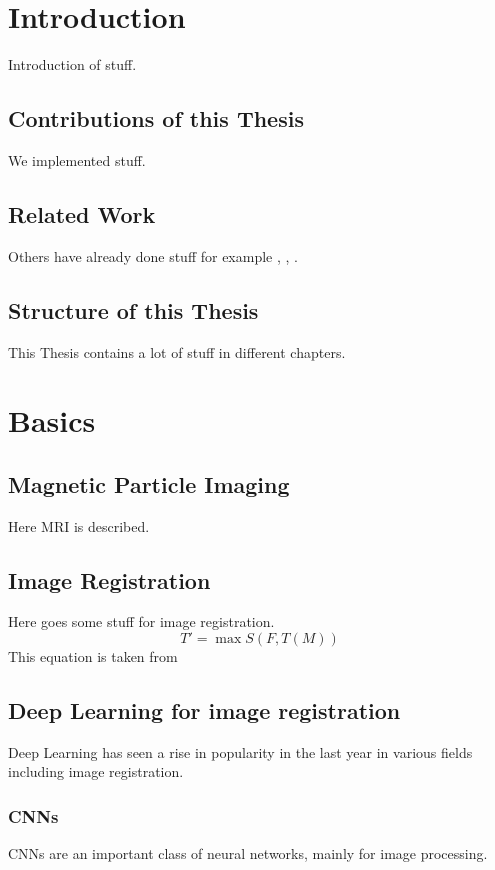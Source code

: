 \documentclass[english,version-2020-11]{uzl-thesis}
\begin{document}
\chapter{Introduction}
Introduction of stuff.

\section{Contributions of this Thesis}
We implemented stuff.

\section{Related Work}
Others have already done stuff for example \cite{Chen_2021}, \cite{Jia2023FourierNetLB}, \cite{Wang_deepflash}.

\section{Structure of this Thesis}
This Thesis contains a lot of stuff in different chapters.




\chapter{Basics}

\section{Magnetic Particle Imaging}
Here MRI is described.

\section{Image Registration}
Here goes some stuff for image registration.
\begin{equation}
	T' = \max S(F, T(M))
\end{equation}
This equation is taken from \cite{Chen_2021}

\section{Deep Learning for image registration}
Deep Learning has seen a rise in popularity in the last year in various fields including image registration.

\subsection{CNNs}
CNNs are an important class of neural networks, mainly for image processing.
\end{document}
